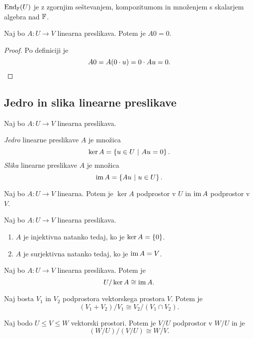 \documentclass[12pt, a4paper]{article}
\begin{document}
\begin{posledica}
$\text{End}_{\mathbb{F}}(U)$ je z zgornjim seštevanjem, kompozitumom in množenjem s skalarjem algebra nad $\mathbb{F}$.
\end{posledica}

\begin{trditev}
Naj bo $A\colon U\to V$ linearna preslikava. Potem je $A0=0$.
\end{trditev}

\begin{proof}
Po definiciji je
\[
A0=A(0\cdot u)=0\cdot Au=0.\qedhere
\]
\end{proof}

\newpage

\subsection{Jedro in slika linearne preslikave}

\begin{okvir}
\begin{definicija}
Naj bo $A\colon U\to V$ linearna preslikava.

\emph{Jedro} linearne preslikave $A$ je množica
\[
\ker A=\left\{u\in U~\middle\vert~Au=0\right\}.
\]
\emph{Slika} linearne preslikave $A$ je množica
\[
\operatorname{im} A=\left\{Au~\middle\vert~u\in U\right\}.
\]
\end{definicija}
\end{okvir}

\begin{izrek}
Naj bo $A\colon U\to V$ linearna. Potem je $\ker A$ podprostor v $U$ in $\operatorname{im} A$ podprostor v $V$.
\end{izrek}

\obvs

\begin{trditev}
Naj bo $A\colon U\to V$ linearna preslikava.

\begin{enumerate}[label=\roman*)]
\item $A$ je injektivna natanko tedaj, ko je $\ker A=\left\{0\right\}$.
\item $A$ je surjektivna natanko tedaj, ko je $\operatorname{im} A=V$.
\end{enumerate}
\end{trditev}

\obvs

\begin{izrek}\label{izo1}
Naj bo $A\colon U\to V$ linearna preslikava. Potem je
\[
U/\ker A\cong\operatorname{im} A.
\]
\end{izrek}
\obvs
\begin{izrek}\label{izo2}
Naj bosta $V_1$ in $V_2$ podprostora vektorskega prostora $V$. Potem je
\[
(V_1+V_2)/V_1\cong V_2/(V_1\cap V_2).
\]
\end{izrek}
\obvs
\begin{izrek}\label{izo3}
Naj bodo $U\leq V\leq W$ vektorski prostori. Potem je $V/U$ podprostor v $W/U$ in je
\[
(W/U)/(V/U)\cong W/V.
\]
\end{izrek}
\obvs
\end{document}
